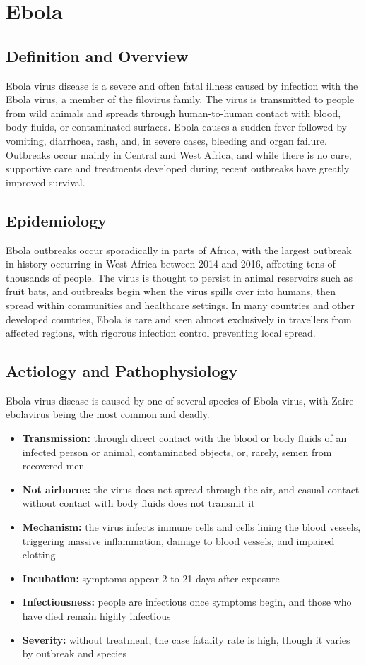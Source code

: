 \chapter{Ebola}

\section*{Definition and Overview}
Ebola virus disease is a severe and often fatal illness caused by infection with the Ebola virus, a member of the filovirus family. The virus is transmitted to people from wild animals and spreads through human-to-human contact with blood, body fluids, or contaminated surfaces. Ebola causes a sudden fever followed by vomiting, diarrhoea, rash, and, in severe cases, bleeding and organ failure. Outbreaks occur mainly in Central and West Africa, and while there is no cure, supportive care and treatments developed during recent outbreaks have greatly improved survival.

\section*{Epidemiology}
Ebola outbreaks occur sporadically in parts of Africa, with the largest outbreak in history occurring in West Africa between 2014 and 2016, affecting tens of thousands of people. The virus is thought to persist in animal reservoirs such as fruit bats, and outbreaks begin when the virus spills over into humans, then spread within communities and healthcare settings. In many countries and other developed countries, Ebola is rare and seen almost exclusively in travellers from affected regions, with rigorous infection control preventing local spread.

\section*{Aetiology and Pathophysiology}
Ebola virus disease is caused by one of several species of Ebola virus, with Zaire ebolavirus being the most common and deadly.
\begin{itemize}
    \item \textbf{Transmission:} through direct contact with the blood or body fluids of an infected person or animal, contaminated objects, or, rarely, semen from recovered men
    \item \textbf{Not airborne:} the virus does not spread through the air, and casual contact without contact with body fluids does not transmit it
    \item \textbf{Mechanism:} the virus infects immune cells and cells lining the blood vessels, triggering massive inflammation, damage to blood vessels, and impaired clotting
    \item \textbf{Incubation:} symptoms appear 2 to 21 days after exposure
    \item \textbf{Infectiousness:} people are infectious once symptoms begin, and those who have died remain highly infectious
    \item \textbf{Severity:} without treatment, the case fatality rate is high, though it varies by outbreak and species
\end{itemize}

